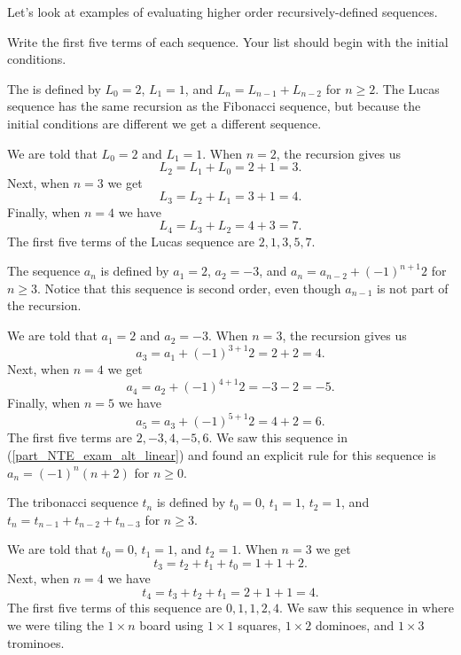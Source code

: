 Let's look at examples of evaluating higher order recursively-defined sequences.

\begin{exam}
\label{exam_rec_seq_higher_order}
    Write the first five terms of each sequence.  Your list should begin with the initial conditions.
        \begin{apart}
            \item The  is defined by $L_0=2$, $L_1=1$, and $L_n=L_{n-1}+L_{n-2}$ for $n\ge 2$. The Lucas sequence has the same recursion as the Fibonacci sequence, but because the initial conditions are different we get a different sequence.
                \begin{soln}
                    We are told that $L_0=2$ and $L_1=1$.  When $n=2$, the recursion gives us 
                        $$L_2=L_1+L_0=2+1=3.$$
                    Next, when $n=3$ we get 
                        $$L_3=L_2+L_1=3+1=4.$$
                    Finally, when $n=4$ we have
                        $$L_4=L_3+L_2=4+3=7.$$
                    The first five terms of the Lucas sequence are $2,1,3,5,7$.
                \end{soln}
            \item The sequence $a_n$ is defined by $a_1=2$, $a_2=-3$, and $a_n=a_{n-2}+(-1)^{n+1}2$ for $n\ge 3$.  Notice that this sequence  is second order, even though $a_{n-1}$ is not part of the recursion.
                \begin{soln}
                    We are told that $a_1=2$ and $a_2=-3$.  When $n=3$, the recursion gives us 
                        $$a_3=a_1+(-1)^{3+1}2=2+2=4.$$
                    Next, when $n=4$ we get 
                        $$a_4=a_2+(-1)^{4+1}2=-3-2=-5.$$
                    Finally, when $n=5$ we have
                        $$a_5=a_3+(-1)^{5+1}2=4+2=6.$$
                    The first five terms are $2,-3,4,-5,6$. We saw this sequence in
                    (\ref{part_NTE_exam_alt_linear}) and found an explicit rule for this sequence is $a_n=(-1)^n(n+2)$ for $n \ge 0$.
                \end{soln}            
            \item The tribonacci sequence $t_n$ is defined by $t_0=0$, $t_1=1$, $t_2=1$, and $t_n=t_{n-1}+t_{n-2}+t_{n-3}$ for $n\ge 3$.
                \begin{soln}
                    We are told that $t_0=0$, $t_1=1$, and $t_2=1$.  When $n=3$ we get 
                        $$t_3=t_2+t_1+t_0=1+1+2.$$
                    Next, when $n=4$ we have
                        $$t_4=t_3+t_2+t_1=2+1+1=4.$$
                    The first five terms of this sequence are $0,1,1,2,4$.  We saw this sequence in   where we were tiling the $1 \times n$ board using $1\times 1$ squares, $1 \times 2$ dominoes, and $1\times 3$ trominoes.
                \end{soln}        
        \end{apart}
\end{exam}

